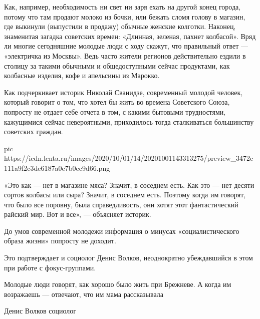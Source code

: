 Как, например, необходимость ни свет ни заря ехать на другой конец города,
потому что там продают молоко из бочки, или бежать сломя голову в магазин, где
выкинули (выпустили в продажу) обычные женские колготки. Наконец, знаменитая
загадка советских времен: «Длинная, зеленая, пахнет колбасой». Вряд ли многие
сегодняшние молодые люди с ходу скажут, что правильный ответ — «электричка из
Москвы». Ведь часто жители регионов действительно ездили в столицу за такими
обычными и общедоступными сейчас продуктами, как колбасные изделия, кофе и
апельсины из Марокко.

Как подчеркивает историк Николай Сванидзе, современный молодой человек, который
говорит о том, что хотел бы жить во времена Советского Союза, попросту не
отдает себе отчета в том, с какими бытовыми трудностями, кажущимися сейчас
невероятными, приходилось тогда сталкиваться большинству советских граждан.

\ifcmt
pic https://icdn.lenta.ru/images/2020/10/01/14/20201001143313275/preview_3472c111a9f2c3de6187a0e7b0ec9d66.png
\fi

«Это как — нет в магазине мяса? Значит, в соседнем есть. Как это — нет десяти
сортов колбасы или сыра? Значит, в соседнем есть. Поэтому когда им говорят, что
было все поровну, была справедливость, они хотят этот фантастический райский
мир. Вот и все», — объясняет историк.

До умов современной молодежи информация о минусах «социалистического образа
жизни» попросту не доходит.

Это подтверждает и социолог Денис Волков, неоднократно убеждавшийся в этом при
работе с фокус-группами.

Молодые люди говорят, как хорошо было жить при Брежневе. А когда им возражаешь
— отвечают, что им мама рассказывала

Денис Волков социолог
